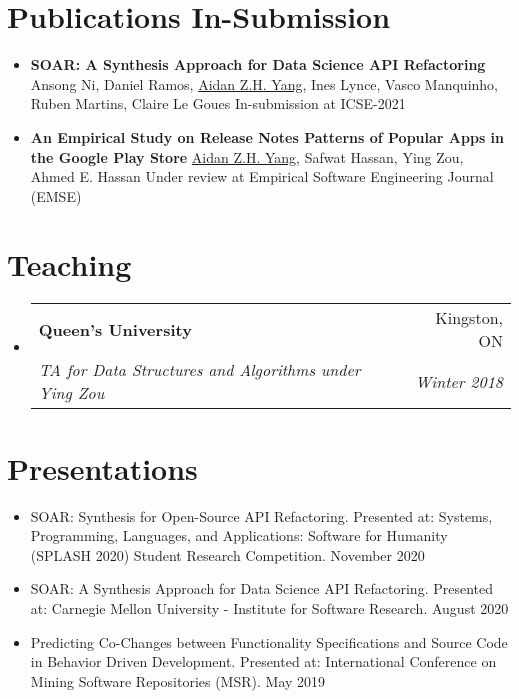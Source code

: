 \documentclass[letterpaper,11pt]{article}
\makeatletter
\newcommand{\resumeSubheading}[4]{
  \vspace{-1pt}\item
    \begin{tabular*}{0.97\textwidth}{l@{\extracolsep{\fill}}r}
      \textbf{#1} & #2 \\
      \textit{\small#3} & \textit{\small #4} \\
    \end{tabular*}\vspace{-5pt}
}
\newcommand{\resumeSubHeadingListStart}{\begin{itemize}[leftmargin=*]}
\newcommand{\resumeSubHeadingListEnd}{\end{itemize}}
\makeatother
\begin{document}
\section{Publications In-Submission}
\resumeSubHeadingListStart

\item{
	{\textbf{SOAR: A Synthesis Approach for Data Science API Refactoring} \newline
		Ansong Ni, Daniel Ramos, \underline{Aidan Z.H. Yang}, Ines Lynce, Vasco Manquinho, Ruben Martins, Claire Le Goues\newline
		In-submission at ICSE-2021
	}
}
\item{
	{\textbf{An Empirical Study on Release Notes Patterns of Popular Apps in the Google Play Store} \newline
		\underline{Aidan Z.H. Yang}, Safwat Hassan, Ying Zou, Ahmed E. Hassan \newline
		Under review at Empirical Software Engineering Journal (EMSE)
	}
}
\resumeSubHeadingListEnd

\section{Teaching}
\resumeSubHeadingListStart

\resumeSubheading
{Queen's University}{Kingston, ON}
{TA for Data Structures and Algorithms under Ying Zou}{Winter 2018}
\resumeSubHeadingListEnd

\section{Presentations}
\resumeSubHeadingListStart
\item{SOAR: Synthesis for Open-Source API Refactoring. Presented at: Systems, Programming, Languages, and Applications: Software for Humanity (SPLASH 2020) Student Research Competition. November 2020}

\item{SOAR: A Synthesis Approach for Data Science API Refactoring. Presented at: Carnegie Mellon University - Institute for Software Research. August 2020}

\item{Predicting Co-Changes between Functionality Specifications and Source Code in Behavior Driven Development. Presented at: International Conference on Mining Software Repositories (MSR). May 2019	
}
\resumeSubHeadingListEnd
\end{document}

